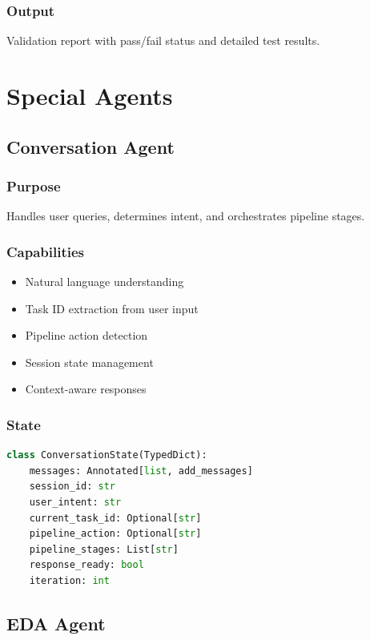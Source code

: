 \documentclass[12pt,a4paper]{report}
\begin{document}
\subsection{Output}
Validation report with pass/fail status and detailed test results.

\chapter{Special Agents}

\section{Conversation Agent}
\subsection{Purpose}
Handles user queries, determines intent, and orchestrates pipeline stages.

\subsection{Capabilities}
\begin{itemize}
    \item Natural language understanding
    \item Task ID extraction from user input
    \item Pipeline action detection
    \item Session state management
    \item Context-aware responses
\end{itemize}

\subsection{State}
\begin{lstlisting}[language=Python]
class ConversationState(TypedDict):
    messages: Annotated[list, add_messages]
    session_id: str
    user_intent: str
    current_task_id: Optional[str]
    pipeline_action: Optional[str]
    pipeline_stages: List[str]
    response_ready: bool
    iteration: int
\end{lstlisting}

\section{EDA Agent}
\end{document}
